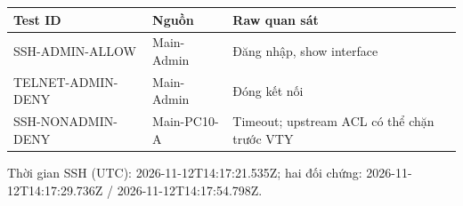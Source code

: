 \begin{tabularx}{\linewidth}{@{}XX X@{}}\toprule
Test ID & Nguồn & Raw quan sát\\\midrule
SSH-ADMIN-ALLOW & Main-Admin & Đăng nhập, show interface\\
TELNET-ADMIN-DENY & Main-Admin & Đóng kết nối\\
SSH-NONADMIN-DENY & Main-PC10-A & Timeout; upstream ACL có thể chặn trước VTY\\
\bottomrule\end{tabularx}

Thời gian SSH (UTC): 2026-11-12T14:17:21.535Z; hai đối chứng: 2026-11-12T14:17:29.736Z / 2026-11-12T14:17:54.798Z.
